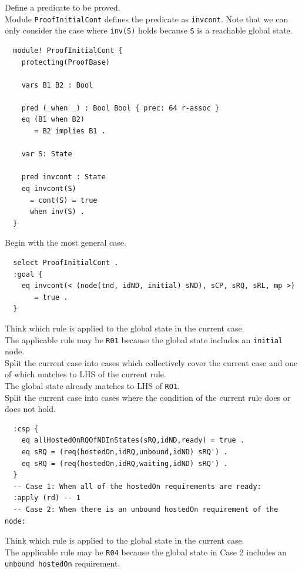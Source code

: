 \documentclass[12pt]{report}
\newcommand{\stt}[1]{{\small{\tt {#1}}}}
\begin{document}
 Define a predicate to be proved.\\
Module {\tt ProofInitialCont} defines the predicate as {\tt invcont}.
Note that we can only consider the case where \stt{inv(S)} holds
because {\tt S} is a reachable global state.
\small
\begin{verbatim}
  module! ProofInitialCont {
    protecting(ProofBase)
  
    vars B1 B2 : Bool
  
    pred (_when _) : Bool Bool { prec: 64 r-assoc }
    eq (B1 when B2)
       = B2 implies B1 .
  
    var S: State
  
    pred invcont : State
    eq invcont(S) 
      = cont(S) = true
      when inv(S) .
  }
\end{verbatim}
\normalsize
 Begin with the most general case.
\small
\begin{verbatim}
  select ProofInitialCont .
  :goal {
    eq invcont(< (node(tnd, idND, initial) sND), sCP, sRQ, sRL, mp >) 
       = true .
  }
\end{verbatim}
\normalsize
 Think which rule is applied to the 
global state in the current case. \\
The applicable rule may be {\tt R01} because the global state includes
an {\tt initial} node.\\

 Split the current case into cases which
collectively cover the current case and one of which matches to LHS of
the current rule. \\ 
The global state already matches to LHS of {\tt RO1}.\\

 Split the current case into cases where
the condition of the current rule does or does not hold.
\small
\begin{verbatim}
  :csp { 
    eq allHostedOnRQOfNDInStates(sRQ,idND,ready) = true .
    eq sRQ = (req(hostedOn,idRQ,unbound,idND) sRQ') .
    eq sRQ = (req(hostedOn,idRQ,waiting,idND) sRQ') .
  }
  -- Case 1: When all of the hostedOn requirements are ready:
  :apply (rd) -- 1
  -- Case 2: When there is an unbound hostedOn requirement of the node:
\end{verbatim}
\normalsize
 Think which rule is applied to the 
global state in the current case. \\
The applicable rule may be {\tt R04} because the global state in Case
2 includes an {\tt unbound hostedOn} requirement.\\
\end{document}

